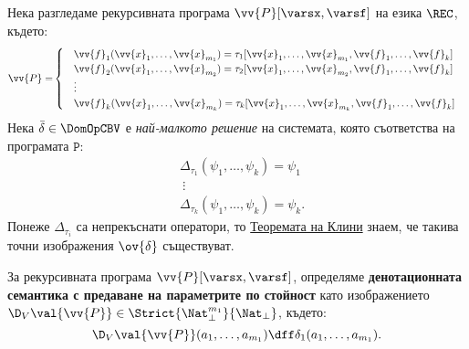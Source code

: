Нека разгледаме рекурсивната програма $\vv{P}[\varsx,\varsf]$ на езика $\REC$, където:
\begin{align*}
  \vv{P} = & 
             \begin{cases}
               & \vv{f}_1(\vv{x}_1,\dots,\vv{x}_{m_1}) = \tau_1[\vv{x}_1,\dots,\vv{x}_{m_1},\vv{f}_1,\dots,\vv{f}_k]\\
               & \vv{f}_2(\vv{x}_1,\dots,\vv{x}_{m_2}) = \tau_2[\vv{x}_1,\dots,\vv{x}_{m_2},\vv{f}_1,\dots,\vv{f}_k]\\
               & \vdots\\
               & \vv{f}_k(\vv{x}_1,\dots,\vv{x}_{m_k}) = \tau_k[\vv{x}_1,\dots,\vv{x}_{m_k},\vv{f}_1,\dots,\vv{f}_k]
             \end{cases}
\end{align*}
Нека $\bar{\delta} \in \DomOpCBV$ е {\em най-малкото решение} на системата,
която съответства на програмата $\texttt{P}$:
\begin{align*}
  & \Delta_{\tau_1}(\psi_1,\dots,\psi_k) = \psi_1\\
  & \ \vdots \\
  & \Delta_{\tau_k}(\psi_1,\dots,\psi_k) = \psi_k.
\end{align*}
Понеже $\Delta_{\tau_i}$ са непрекъснати оператори, то \hyperref[th:knaster-tarski]{Теоремата на Клини} знаем, че такива точни изображения $\ov{\delta}$ съществуват.

\begin{framed}
  За рекурсивната програма $\vv{P}[\varsx,\varsf]$, определяме {\bf денотационната семантика с предаване на параметрите по стойност} 
  като изображението $\D_V\val{\vv{P}} \in \Strict{\Nat^{m_1}_\bot}{\Nat_\bot}$, където:
  \[\D_V\val{\vv{P}}(a_1,\dots,a_{m_1}) \dff \delta_1(a_1,\dots,a_{m_1}).\]
\end{framed}

